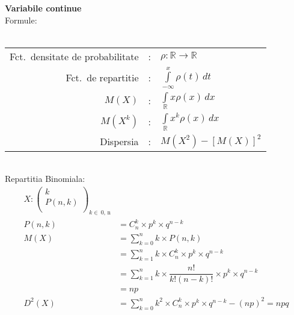 \documentclass{article}
\begin{document}
\textbf{Variabile continue}\\
Formule:\\\\
\begin{tabular}{rcl}
  Fct.\ densitate de probabilitate & : & $ \rho: \mathbb{R}\rightarrow\mathbb{R}$    \\
  Fct.\ de repartitie              & : & $ \int\limits_{-\infty}^x \rho(t)\,dt$      \\
  $M(X)$                           & : & $ \int\limits_{\mathbb{R}} x \rho(x)\,dx$   \\
  $M(X^k)$                         & : & $ \int\limits_{\mathbb{R}} x^k \rho(x)\,dx$ \\
  Dispersia                        & : & $ M(X^2) - [M(X)]^2$                        \\
\end{tabular}\\
Repartitia Binomiala:
\begin{align*}
  X:\begin{pmatrix}
      k       \\
      P(n, k) \\
    \end{pmatrix}_{k\in\ \text{0, n}}
          &                                                                                   \\
  P(n, k) & = C_n^k \times p^k \times q^{n-k}                                                 \\
  M(X)    & = \sum\limits_{k = 0}^n k \times P(n, k)                                          \\
          & = \sum\limits_{k = 1}^n k \times C_n^k \times p^k \times q^{n-k}                  \\
          & = \sum\limits_{k = 1}^n k\times\dfrac{n!}{k!(n-k)!}\times p^k \times q^{n-k}      \\
          & = np                                                                              \\
  D^2(X)  & = \sum\limits_{k = 0}^n k^2 \times C_n^k \times p^k \times q^{n-k} - (np)^2 = npq \\
\end{align*}
\end{document}
